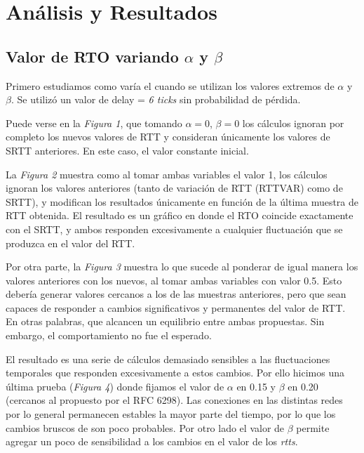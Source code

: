 \section{An\'alisis y Resultados}

    \subsection{Valor de RTO variando $\alpha$ y $\beta$}

        Primero estudiamos como var\'ia el \rto{} cuando se utilizan los
        valores extremos de $\alpha$ y $\beta$. Se utiliz\'o un valor
        de delay = \textit{6 ticks} sin probabilidad de p\'erdida.

        Puede verse en la \textit{Figura 1}, que tomando $\alpha=0$,
        $\beta=0$ los cálculos ignoran por completo los nuevos
        valores de RTT y consideran únicamente los valores de SRTT
        anteriores. En este caso, el valor constante inicial.

        La \textit{Figura 2} muestra como al tomar ambas variables el valor
        1, los cálculos ignoran los valores anteriores (tanto de variación
        de RTT (RTTVAR) como de SRTT), y modifican los resultados
        únicamente en función de la última muestra de RTT obtenida. El
        resultado es un gráfico en donde el RTO coincide exactamente con
        el SRTT, y ambos responden excesivamente a cualquier fluctuación
        que se produzca en el valor del RTT.

        Por otra parte, la \textit{Figura 3} muestra lo que sucede al
        ponderar de igual manera los valores anteriores con los nuevos, al
        tomar ambas variables con valor 0.5. Esto debería generar valores
        cercanos a los de las muestras anteriores, pero que sean capaces
        de responder a cambios significativos y permanentes del valor de
        RTT. En otras palabras, que alcancen un equilibrio entre ambas
        propuestas. Sin embargo, el comportamiento no fue el esperado.

        El resultado es una serie de cálculos demasiado sensibles a las
        fluctuaciones temporales que responden excesivamente a estos
        cambios. Por ello hicimos una \'ultima prueba (\textit{Figura 4})
        donde fijamos el valor de $\alpha$ en 0.15 y $\beta$ en 0.20
        (cercanos al propuesto por el RFC 6298).
        Las conexiones en las distintas redes por lo general permanecen
        estables la mayor parte del tiempo, por lo que los cambios bruscos
        de \rtt{} son poco probables. Por otro lado el valor de $\beta$
        permite agregar un poco de sensibilidad a los cambios en el valor
        de los \textit{rtts}.

